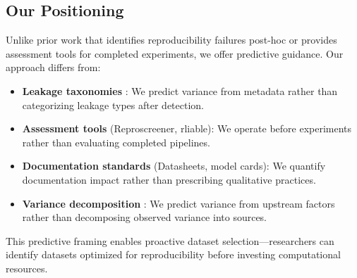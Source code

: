 \subsection{Our Positioning}

Unlike prior work that identifies reproducibility failures post-hoc or provides assessment tools for completed experiments, we offer predictive guidance. Our approach differs from:

\begin{itemize}
    \item \textbf{Leakage taxonomies} \citep{kapoor2022leakage}: We predict variance from metadata rather than categorizing leakage types after detection.
    \item \textbf{Assessment tools} (Reproscreener, rliable): We operate before experiments rather than evaluating completed pipelines.
    \item \textbf{Documentation standards} (Datasheets, model cards): We quantify documentation impact rather than prescribing qualitative practices.
    \item \textbf{Variance decomposition} \citep{bouthillier2021accounting}: We predict variance from upstream factors rather than decomposing observed variance into sources.
\end{itemize}

This predictive framing enables proactive dataset selection---researchers can identify datasets optimized for reproducibility before investing computational resources.
